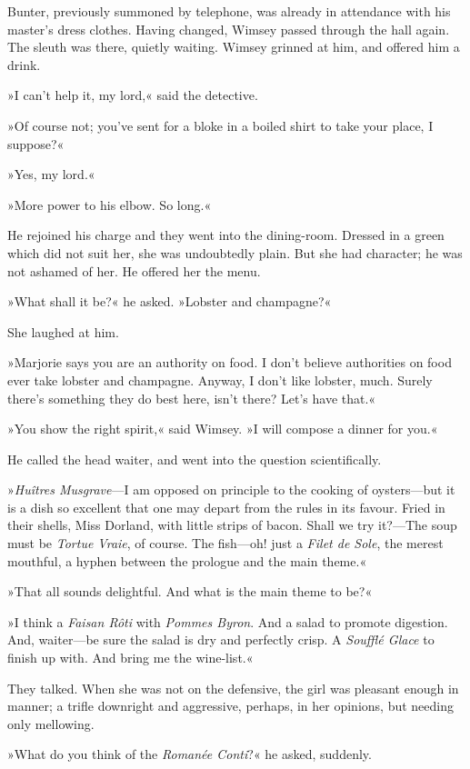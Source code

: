 Bunter, previously summoned by telephone, was already in attendance with his master's dress clothes. Having changed, Wimsey passed through the hall again. The sleuth was there, quietly waiting. Wimsey grinned at him, and offered him a drink.

»I can't help it, my lord,« said the detective.

»Of course not; you've sent for a bloke in a boiled shirt to take your place, I suppose?«

»Yes, my lord.«

»More power to his elbow. So long.«

He rejoined his charge and they went into the dining-room. Dressed in a green which did not suit her, she was undoubtedly plain. But she had character; he was not ashamed of her. He offered her the menu.

»What shall it be?« he asked. »Lobster and champagne?«

She laughed at him.

»Marjorie says you are an authority on food. I don't believe authorities on food ever take lobster and champagne. Anyway, I don't like lobster, much. Surely there's something they do best here, isn't there? Let's have that.«

»You show the right spirit,« said Wimsey. »I will compose a dinner for you.«

He called the head waiter, and went into the question scientifically.

»\textit{Huîtres Musgrave}—I am opposed on principle to the cooking of oysters—but it is a dish so excellent that one may depart from the rules in its favour. Fried in their shells, Miss Dorland, with little strips of bacon. Shall we try it?—The soup must be \textit{Tortue Vraie}, of course. The fish—oh! just a \textit{Filet de Sole}, the merest mouthful, a hyphen between the prologue and the main theme.«

»That all sounds delightful. And what is the main theme to be?«

»I think a \textit{Faisan Rôti} with \textit{Pommes Byron}. And a salad to promote digestion. And, waiter—be sure the salad is dry and perfectly crisp. A \textit{Soufflé Glace} to finish up with. And bring me the wine-list.«

They talked. When she was not on the defensive, the girl was pleasant enough in manner; a trifle downright and aggressive, perhaps, in her opinions, but needing only mellowing.

»What do you think of the \textit{Romanée Conti}?« he asked, suddenly.

